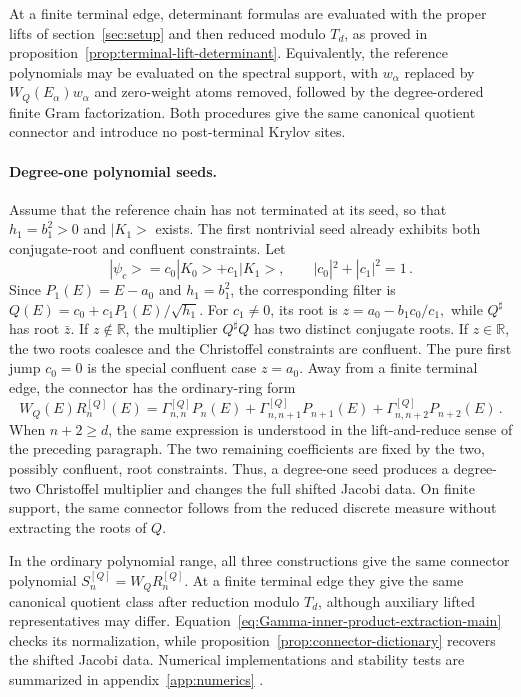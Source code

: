\documentclass[a4paper,11pt]{article}
\def\ket#1{|#1>}%
\theoremstyle{definition}
\theoremstyle{remark}
\newcommand{\ket}[1]{|#1\rangle}
\newcommand{\Qsh}{Q^{\sharp}}
\begin{document}
At a finite terminal edge, determinant formulas are evaluated with the proper lifts of section~\ref{sec:setup} and then reduced modulo $T_d$, as proved in proposition~\ref{prop:terminal-lift-determinant}. Equivalently, the reference polynomials may be evaluated on the spectral support, with $w_\alpha$ replaced by $W_Q(E_\alpha)w_\alpha$ and zero-weight atoms removed, followed by the degree-ordered finite Gram factorization. Both procedures give the same canonical quotient connector and introduce no post-terminal Krylov sites.

\paragraph{Degree-one polynomial seeds.} Assume that the reference chain has not terminated at its seed, so that $h_1=b_1^2>0$ and $\ket{K_1}$ exists. The first nontrivial seed already exhibits both conjugate-root and confluent constraints. Let
\begin{equation}
   \ket{\psi_c}
   =
   c_0\ket{K_0}+c_1\ket{K_1},
   \qquad
   |c_0|^2+|c_1|^2=1\,.
   \label{eq:degree-one-seed-main}
\end{equation}
Since $P_1(E)=E-a_0$ and $h_1=b_1^2$, the corresponding filter is
$
   Q(E)=c_0+c_1P_1(E)/\sqrt{h_1}.
$
For $c_1\ne0$, its root is
$
   z=a_0-b_1c_0/c_1,
$
while $\Qsh$ has root $\bar z$. If $z\notin\mathbb R$, the multiplier
$\Qsh Q$ has two distinct conjugate roots. If $z\in\mathbb R$, the two roots coalesce and the Christoffel constraints are confluent. The pure first jump $c_0=0$ is the special confluent case $z=a_0$. Away from a finite terminal edge, the connector has the ordinary-ring form
\begin{equation}
   W_Q(E)R_n^{[Q]}(E)
   =
   \Gamma_{n,n}^{[Q]}P_n(E)
   +
   \Gamma_{n,n+1}^{[Q]}P_{n+1}(E)
   +
   \Gamma_{n,n+2}^{[Q]}P_{n+2}(E)\,.
   \label{eq:degree-one-connector-main}
\end{equation}
When $n+2\ge d$, the same expression is understood in the lift-and-reduce sense of the preceding paragraph. 
The two remaining coefficients are fixed by the two, possibly confluent, root constraints. Thus, a degree-one seed produces a degree-two Christoffel multiplier and changes the full shifted Jacobi data. On finite support, the same connector follows from the reduced discrete measure without extracting the roots of $Q$.

In the ordinary polynomial range, all three constructions give the same connector polynomial $S_n^{[Q]}=W_QR_n^{[Q]}$. At a finite terminal edge they give the same canonical quotient class after reduction modulo $T_d$, although auxiliary lifted representatives may differ.  Equation~\eqref{eq:Gamma-inner-product-extraction-main} checks its normalization, while proposition~\ref{prop:connector-dictionary} recovers the shifted Jacobi data. Numerical implementations and stability tests are summarized in appendix~\ref{app:numerics} \cite{Gautschi2004,Parlett1998}.
\end{document}
